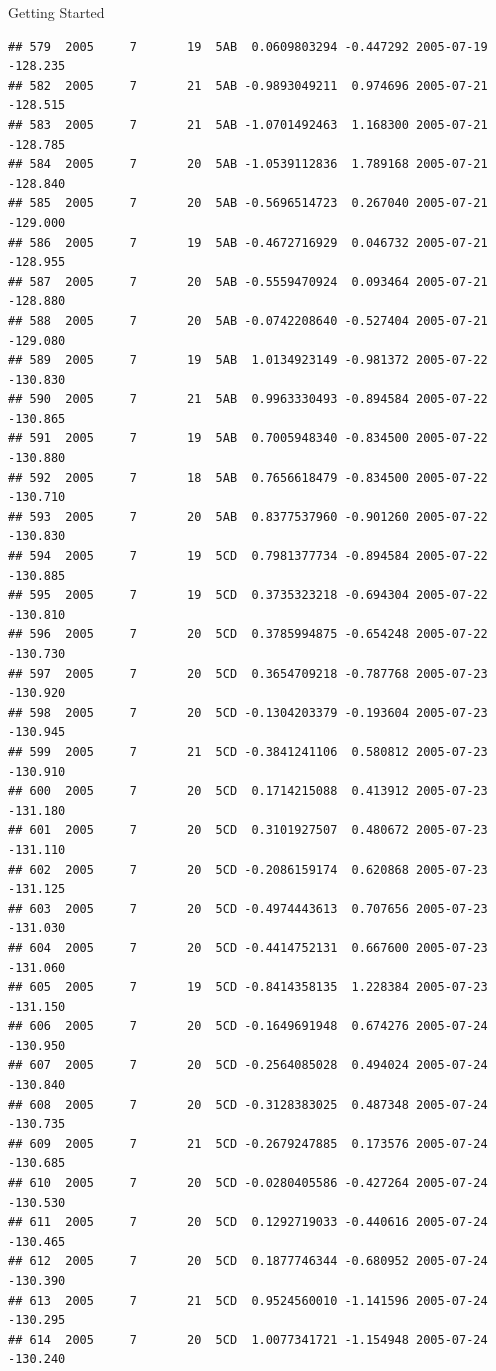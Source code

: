 \documentclass[
  ignorenonframetext,
]{beamer}
\begin{document}
\begin{frame}[fragile]{Getting Started}
\begin{verbatim}
## 579  2005     7       19  5AB  0.0609803294 -0.447292 2005-07-19 -128.235
## 582  2005     7       21  5AB -0.9893049211  0.974696 2005-07-21 -128.515
## 583  2005     7       21  5AB -1.0701492463  1.168300 2005-07-21 -128.785
## 584  2005     7       20  5AB -1.0539112836  1.789168 2005-07-21 -128.840
## 585  2005     7       20  5AB -0.5696514723  0.267040 2005-07-21 -129.000
## 586  2005     7       19  5AB -0.4672716929  0.046732 2005-07-21 -128.955
## 587  2005     7       20  5AB -0.5559470924  0.093464 2005-07-21 -128.880
## 588  2005     7       20  5AB -0.0742208640 -0.527404 2005-07-21 -129.080
## 589  2005     7       19  5AB  1.0134923149 -0.981372 2005-07-22 -130.830
## 590  2005     7       21  5AB  0.9963330493 -0.894584 2005-07-22 -130.865
## 591  2005     7       19  5AB  0.7005948340 -0.834500 2005-07-22 -130.880
## 592  2005     7       18  5AB  0.7656618479 -0.834500 2005-07-22 -130.710
## 593  2005     7       20  5AB  0.8377537960 -0.901260 2005-07-22 -130.830
## 594  2005     7       19  5CD  0.7981377734 -0.894584 2005-07-22 -130.885
## 595  2005     7       19  5CD  0.3735323218 -0.694304 2005-07-22 -130.810
## 596  2005     7       20  5CD  0.3785994875 -0.654248 2005-07-22 -130.730
## 597  2005     7       20  5CD  0.3654709218 -0.787768 2005-07-23 -130.920
## 598  2005     7       20  5CD -0.1304203379 -0.193604 2005-07-23 -130.945
## 599  2005     7       21  5CD -0.3841241106  0.580812 2005-07-23 -130.910
## 600  2005     7       20  5CD  0.1714215088  0.413912 2005-07-23 -131.180
## 601  2005     7       20  5CD  0.3101927507  0.480672 2005-07-23 -131.110
## 602  2005     7       20  5CD -0.2086159174  0.620868 2005-07-23 -131.125
## 603  2005     7       20  5CD -0.4974443613  0.707656 2005-07-23 -131.030
## 604  2005     7       20  5CD -0.4414752131  0.667600 2005-07-23 -131.060
## 605  2005     7       19  5CD -0.8414358135  1.228384 2005-07-23 -131.150
## 606  2005     7       20  5CD -0.1649691948  0.674276 2005-07-24 -130.950
## 607  2005     7       20  5CD -0.2564085028  0.494024 2005-07-24 -130.840
## 608  2005     7       20  5CD -0.3128383025  0.487348 2005-07-24 -130.735
## 609  2005     7       21  5CD -0.2679247885  0.173576 2005-07-24 -130.685
## 610  2005     7       20  5CD -0.0280405586 -0.427264 2005-07-24 -130.530
## 611  2005     7       20  5CD  0.1292719033 -0.440616 2005-07-24 -130.465
## 612  2005     7       20  5CD  0.1877746344 -0.680952 2005-07-24 -130.390
## 613  2005     7       21  5CD  0.9524560010 -1.141596 2005-07-24 -130.295
## 614  2005     7       20  5CD  1.0077341721 -1.154948 2005-07-24 -130.240

\end{verbatim}
\end{frame}
\end{document}

